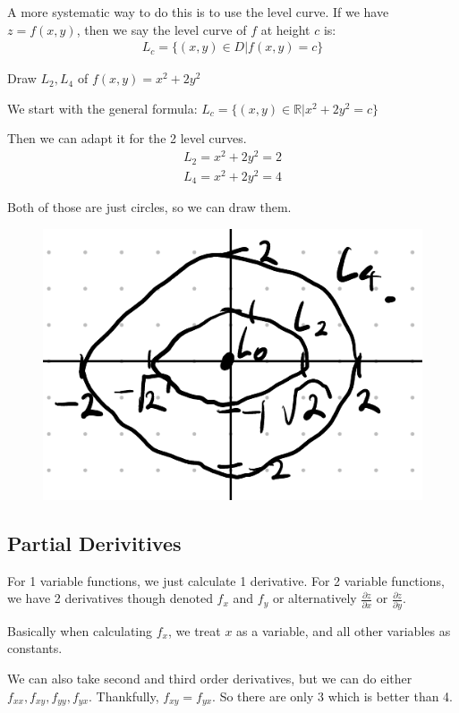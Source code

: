 \documentclass[12pt,letterpaper]{article} \usepackage{amsmath} \usepackage{graphicx}  \usepackage{longtable}  \usepackage{amssymb}
\begin{document}
    A more systematic way to do this is to use the level curve. If we have $z=f(x,y)$, then we say the level curve of $f$ at height $c$ is:
    \begin{align*}
        L_c = \{(x,y)\in D | f(x,y)=c\}
    \end{align*}

    \begin{mdframed}
        Draw $L_2, L_4$ of $f(x,y) = x^2 + 2y^2$

        We start with the general formula: $L_c = \{(x,y) \in \mathbb{R} | x^2 + 2y^2 = c\}$

        Then we can adapt it for the 2 level curves. 
        \begin{align*}
            L_2 = x^2 + 2y^2 = 2\\
            L_4 = x^2 + 2y^2 = 4
        \end{align*}

        Both of those are just circles, so we can draw them. 

        \begin{figure}[H]
            \centering
            \includegraphics[width=0.4\linewidth]{ex3.png}
        \end{figure}
    \end{mdframed}

        \subsection{Partial Derivitives}
        For 1 variable functions, we just calculate 1 derivative. For 2 variable functions, we have 2 derivatives though denoted $f_x$ and $f_y$ or alternatively $\frac{\partial z}{\partial x}$ or $\frac{\partial z}{\partial y}$. 

        Basically when calculating $f_x$, we treat $x$ as a variable, and all other variables as constants. 

        We can also take second and third order derivatives, but we can do either $f_{xx}, f_{xy}, f_{yy}, f_{yx}$. Thankfully, $f_{xy} = f_{yx}$. So there are only 3 which is better than 4. 
\end{document}
